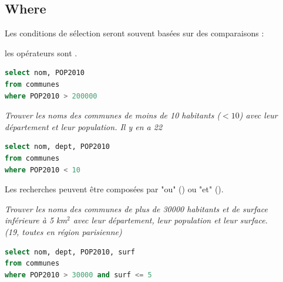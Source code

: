 \subsection{Where}
Les conditions de sélection seront souvent basées sur des comparaisons : 

les opérateurs sont .
\begin{lstlisting}[language=SQL]
select nom, POP2010 
from communes 
where POP2010 > 200000 
\end{lstlisting}
\begin{Exercise}
\textit{Trouver les noms des communes de moins de 10 habitants ($<10$) avec leur département et leur population. Il y en a 22}
\end{Exercise}
\begin{Answer}
\begin{lstlisting}[language=SQL]
select nom, dept, POP2010
from communes  
where POP2010 < 10 
\end{lstlisting}
\end{Answer}
\medskip
Les recherches peuvent être composées par "ou" () ou "et" ().
\begin{Exercise}
\textit{Trouver les noms des communes de plus de 30000 habitants et de surface inférieure à 5 km$^2$ avec leur département, leur population et leur surface.\\
(19, toutes en région parisienne)}
\end{Exercise}
\begin{Answer}
\begin{lstlisting}[language=SQL]
select nom, dept, POP2010, surf
from communes 
where POP2010 > 30000 and surf <= 5
\end{lstlisting}
\end{Answer}
